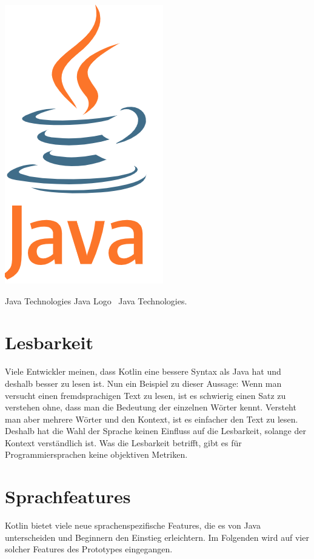 \documentclass{sigchi-ext}
\begin{document}
\begin{marginfigure}[1pc]
  \begin{minipage}{\marginparwidth}
    \includegraphics[width=0.9\marginparwidth]{figures/javalogo.png}
    \caption{Java Technologies Java Logo
      \cczero~Java Technologies.}
  \end{minipage}
\end{marginfigure}


\section{Lesbarkeit}
Viele Entwickler meinen, dass Kotlin eine bessere Syntax als Java hat und deshalb besser
zu lesen ist. Nun ein Beispiel zu dieser Aussage: Wenn man versucht einen fremdsprachigen
Text zu lesen, ist es schwierig einen Satz zu verstehen ohne, dass man die Bedeutung der
einzelnen Wörter kennt. Versteht man aber mehrere Wörter und den Kontext, ist es einfacher den
Text zu lesen. Deshalb hat die Wahl der Sprache keinen Einfluss auf die Lesbarkeit, solange
der Kontext verständlich ist.
Was die Lesbarkeit betrifft, gibt es für Programmiersprachen keine objektiven Metriken.

\section{Sprachfeatures}
Kotlin bietet viele neue sprachenspezifische Features, die es von Java unterscheiden und Beginnern den Einstieg erleichtern. Im Folgenden wird auf vier solcher Features des Prototypes eingegangen.
\end{document}
